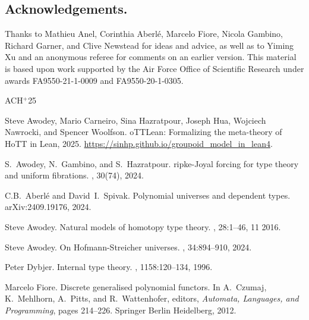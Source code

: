 \documentclass[12pt,reqno]{amsart}
\theoremstyle{remark}
\theoremstyle{definition}
\begin{document}
\subsection*{Acknowledgements.}

\quad Thanks to Mathieu Anel, Corinthia Aberl\'e, Marcelo Fiore, Nicola Gambino, Richard Garner, and Clive Newstead for ideas and advice, as well as to Yiming Xu and an anonymous referee for comments on an earlier version.  This material is based upon work supported by the Air Force Office of Scientific Research under awards FA9550-21-1-0009 and FA9550-20-1-0305.


%
\newcommand{\etalchar}[1]{$^{#1}$}
\begin{thebibliography}{ACH{\etalchar{+}}25}

\bibitem[ACH{\etalchar{+}}25]{HoTTLean}
Steve Awodey, Mario Carneiro, Sina Hazratpour, Joseph Hua, Wojciech Nawrocki,
  and Spencer Woolfson.
o{TTL}ean: Formalizing the meta-theory of {H}o{TT} in {L}ean,
  2025.
\newblock \url{https://sinhp.github.io/groupoid_model_in_lean4}.

S.~Awodey, N.~Gambino, and S.~Hazratpour.
ripke-{J}oyal forcing for type theory and uniform fibrations.
, 30(74), 2024.

C.B.\ Aberl\'e and David~I.\ Spivak.
\newblock Polynomial universes and dependent types.
\newblock arXiv:2409.19176, 2024.

Steve Awodey.
\newblock Natural models of homotopy type theory.
, 28:1--46, 11 2016.

Steve Awodey.
\newblock On {H}ofmann-{S}treicher universes.
, 34:894--910, 2024.

Peter Dybjer.
\newblock Internal type theory.
, 1158:120--134, 1996.

Marcelo Fiore.
\newblock Discrete generalised polynomial functors.
\newblock In A.\ Czumaj, K.\ Mehlhorn, A.\ Pitts, and R.\ Wattenhofer, editors,
  {\em Automata, Languages, and Programming}, pages 214--226. Springer Berlin
  Heidelberg, 2012.


\end{thebibliography}
\end{document}
